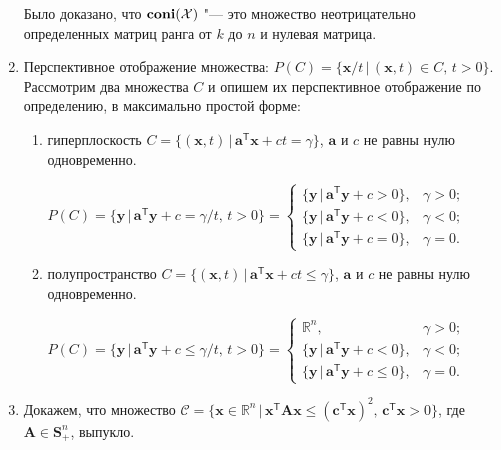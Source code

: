 \documentclass[a4paper,12pt]{article}
\begin{document}
\begin{enumerate}
		Было доказано, что $\text{\textbf{coni}}(\mathcal{X})$ "--- это множество неотрицательно определенных матриц ранга от $k$ до $n$ и нулевая матрица.
 		
		\item
		
		Перспективное отображение множества: $P(C) = \{\mathbf{x}/t \,|\, (\mathbf{x}, t) \in C,\, t > 0\}$. Рассмотрим два множества $C $ и опишем их перспективное отображение по определению, в максимально простой форме:
		
		\begin{enumerate}
			\item
			гиперплоскость $C = \{(\mathbf{x}, t) \,|\, \mathbf{a}^\mathsf{T} \mathbf{x} + c t = \gamma \}$, $\mathbf{a}$ и $c$ не равны нулю одновременно.
			
			$P(C) = \{ \mathbf{y} \,|\, \mathbf{a}^\mathsf{T} \mathbf{y} + c = \gamma / t,\, t > 0 \} = 
			\begin{cases}
				\{ \mathbf{y} \,|\, \mathbf{a}^\mathsf{T} \mathbf{y} + c > 0  \},& \gamma > 0;\\
				 \{ \mathbf{y} \,|\,\mathbf{a}^\mathsf{T} \mathbf{y} + c < 0  \},& \gamma < 0; \\
				
				\{ \mathbf{y} \,|\, \mathbf{a}^\mathsf{T} \mathbf{y} + c = 0  \},& \gamma = 0.
			\end{cases}$
			
			\item полупространство $C = \{(\mathbf{x}, t) \,|\, \mathbf{a}^\mathsf{T} \mathbf{x} + c t \leqslant \gamma \}$, $\mathbf{a}$ и $c$ не равны нулю одновременно.
			
			$P(C) = \{ \mathbf{y} \,|\, \mathbf{a}^\mathsf{T} \mathbf{y} + c \leqslant \gamma / t,\, t > 0 \} = 
			\begin{cases}
				\mathbb{R}^n,& \gamma > 0 ;\\
				
				\{ \mathbf{y} \,|\, \mathbf{a}^\mathsf{T} \mathbf{y} + c < 0  \},& \gamma < 0 ;\\
				
				\{ \mathbf{y} \,|\, \mathbf{a}^\mathsf{T} \mathbf{y} + c \leqslant 0  \},& \gamma = 0 .
			\end{cases}$
			
		\end{enumerate}
		
		\item
		
		Докажем, что множество $\mathcal{C} = \{
		\mathbf{x} \in \mathbb{R}^n \,|\, \mathbf{x}^\mathsf{T} \mathbf{A} \mathbf{x} \leqslant (\mathbf{c}^\mathsf{T} \mathbf{x})^2,\, \mathbf{c}^\mathsf{T} \mathbf{x} > 0\}$, где $\mathbf{A} \in \mathbf{S}^n_{+}$, выпукло.
		

\end{enumerate}
\end{document}
